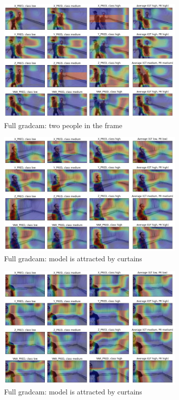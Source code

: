 \begin{figure}[!h]
\centering
\includegraphics[width=0.8\textwidth]{"contents/images/gradcam/apx-gradcam-2"}
\caption[]{Full \gls{gradcam}: two people in the frame}
\label{fig:apx-gradcam-2}
\end{figure}

\begin{figure}[!h]
\centering
\includegraphics[width=0.8\textwidth]{"contents/images/gradcam/apx-gradcam-3"}
\caption[Full \gls{gradcam}: model is attracted by curtains]{Full \gls{gradcam}: model is attracted by curtains}
\label{fig:apx-gradcam-3}
\end{figure}

\begin{figure}[!h]
\centering
\includegraphics[width=0.8\textwidth]{"contents/images/gradcam/apx-gradcam-4"}
\caption[]{Full \gls{gradcam}: model is attracted by curtains}
\label{fig:apx-gradcam-4}
\end{figure}

